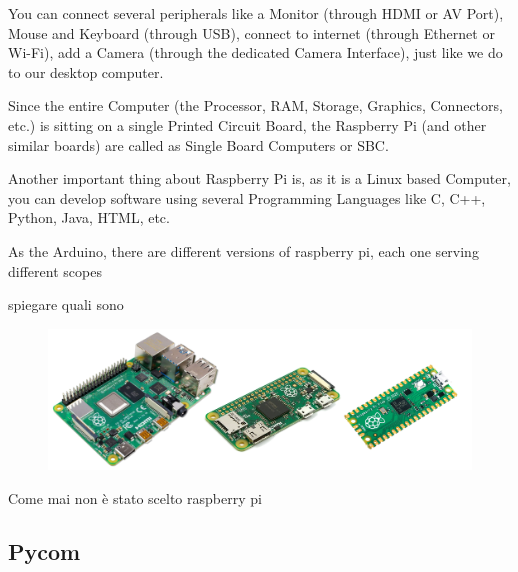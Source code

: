 		You can connect several peripherals like a Monitor (through HDMI or AV Port), Mouse and Keyboard (through USB), connect to internet (through Ethernet or Wi-Fi), add a Camera (through the dedicated Camera Interface), just like we do to our desktop computer.
		
		Since the entire Computer (the Processor, RAM, Storage, Graphics, Connectors, etc.) is sitting on a single Printed Circuit Board, the Raspberry Pi (and other similar boards) are called as Single Board Computers or SBC.
		
		Another important thing about Raspberry Pi is, as it is a Linux based Computer, you can develop software using several Programming Languages like C, C++, Python, Java, HTML, etc.
		
		
		As the Arduino, there are different versions of raspberry pi, each one serving different scopes
		
		spiegare quali sono 
		
		\begin{figure}
			\centering
			\includegraphics[width=\textwidth]{resources/img/chap3/raspberry_types}
			\caption{}
		\end{figure}
				
		Come mai non è stato scelto raspberry pi
			
	\subsection{Pycom}
	
		
